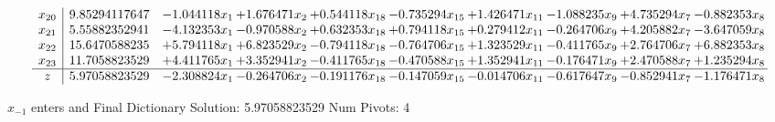 \documentclass[10pt]{article}
\begin{document}
\[\begin{array}{c| c c@{\hskip 2pt} c@{\hskip 2pt} c@{\hskip 2pt} c@{\hskip 2pt} c@{\hskip 2pt} c@{\hskip 2pt} c@{\hskip 2pt} c@{\hskip 2pt} }
 x_{20}   &  9.85294117647 & -1.044118 x_{1} & + 1.676471 x_{2} & + 0.544118 x_{18} & -0.735294 x_{15} & + 1.426471 x_{11} & -1.088235 x_{9} & + 4.735294 x_{7} & -0.882353 x_{8}\\
 x_{21}   &  5.55882352941 & -4.132353 x_{1} & -0.970588 x_{2} & + 0.632353 x_{18} & + 0.794118 x_{15} & + 0.279412 x_{11} & -0.264706 x_{9} & + 4.205882 x_{7} & -3.647059 x_{8}\\
 x_{22}   &  15.6470588235 & + 5.794118 x_{1} & + 6.823529 x_{2} & -0.794118 x_{18} & -0.764706 x_{15} & + 1.323529 x_{11} & -0.411765 x_{9} & + 2.764706 x_{7} & + 6.882353 x_{8}\\
 x_{23}   &  11.7058823529 & + 4.411765 x_{1} & + 3.352941 x_{2} & -0.411765 x_{18} & -0.470588 x_{15} & + 1.352941 x_{11} & -0.176471 x_{9} & + 2.470588 x_{7} & + 1.235294 x_{8}\\
\hline
z    &  5.97058823529 & -2.308824 x_{1} & -0.264706 x_{2} & -0.191176 x_{18} & -0.147059 x_{15} & -0.014706 x_{11} & -0.617647 x_{9} & -0.852941 x_{7} & -1.176471 x_{8}\\
\end{array}\]


 $ x_{-1} $ enters and Final Dictionary
Solution:  5.97058823529
Num Pivots:  4
\end{document}
